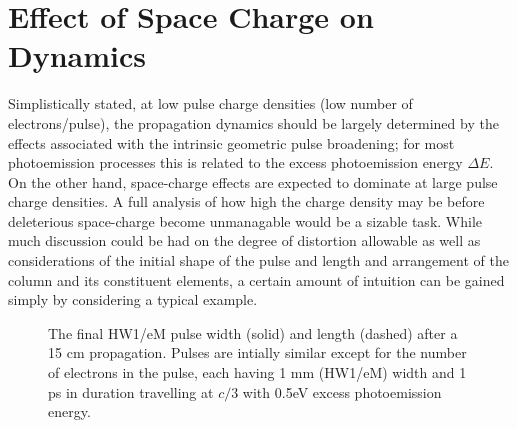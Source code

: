 
\section{Effect of Space Charge on Dynamics} \label{sec:free_spacecharge}

Simplistically stated, at low pulse charge densities (low number of electrons/pulse), the propagation dynamics should be largely determined by the effects associated with the intrinsic geometric pulse broadening; for most photoemission processes this is related to the excess photoemission energy $\Delta E$.
On the other hand, space-charge effects are expected to dominate at large pulse charge densities.
A full analysis of how high the charge density may be before deleterious space-charge become unmanagable would be a sizable task.
While much discussion could be had on the degree of distortion allowable as well as considerations of the initial shape of the pulse and length and arrangement of the column and its constituent elements, a certain amount of intuition can be gained simply by considering a typical example.

\begin{figure}
  \centering
  \begin{tikzpicture}
    
  \end{tikzpicture}
  \caption[Idealistic free-space pulse evolution vs charge density]{
    The final HW1/eM pulse width (solid) and length (dashed) after a 15 cm propagation. 
    Pulses are intially similar except for the number of electrons in the pulse, each having 1 mm (HW1/eM) width and 1 ps in duration travelling at $c/3$ with 0.5eV excess photoemission energy.
  }
  \label{fig:spacecharge_noacc}
\end{figure}

